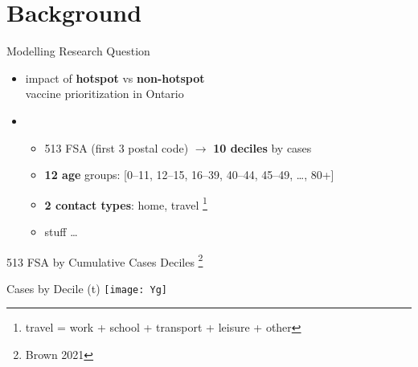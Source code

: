 \section{Background}
\begin{frame}{Modelling Research Question}
  \begin{itemize}
    \item {}
      impact of \textbf{hotspot} vs \textbf{non-hotspot}\\
      \covid vaccine prioritization in Ontario
      \bigskip
    \item {}
    \begin{itemize}
      \item 513 FSA (first 3 postal code) $\rightarrow$ \textbf{10 deciles} by cases
      \item \textbf{12 age} groups: [0--11, 12--15, 16--39, 40--44, 45--49, \dots, 80+]
      \item \textbf{2 contact types}: home, travel%
        \footnote{travel = work + school + transport + leisure + other}
      \item \covid stuff \dots
    \end{itemize}
  \end{itemize}
\end{frame}
\begin{frame}{513 FSA by Cumulative \Covid Cases Deciles}
  \centering\scalebox{.9}{}
  \footnote{Brown 2021}
\end{frame}
\begin{frame}{\Covid Cases by Decile (t)}
  \centering\texttt{[image: Yg]}
\end{frame}
